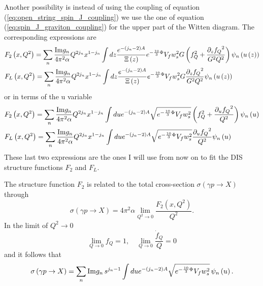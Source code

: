 \documentclass[a4paper,12pt]{article}
\begin{document}
Another possibility is instead of using the coupling of equation (\ref{eq:open_string_spin_J_coupling}) we use the one of equation (\ref{eq:spin_J_graviton_coupling}) for the upper part of the Witten diagram. The corresponding expressions are
\begin{align}
&F_2\left(x, Q^2\right) = \sum_n \frac{{\rm Im} g_n }{4\pi^2 \alpha} Q^{2 j_n} x^{1-j_n} \int dz \frac{e^{-\left(j_n - 2 \right)A }}{\Xi\left(z\right)}e^{-\frac{10}{3} \Phi} V_f w_s^2 G \left(f_Q^2 +\frac{\partial_z{f_Q}^2}{G^2Q^2} \right) \psi_n\left(u\left(z\right)\right)\\
&F_L\left(x, Q^2\right) = \sum_n \frac{{\rm Im} g_n }{4\pi^2 \alpha} Q^{2 j_n} x^{1-j_n} \int dz \frac{e^{-\left(j_n - 2 \right)A }}{\Xi\left(z\right)}e^{-\frac{10}{3} \Phi} V_f w_s^2 G \frac{\partial_z{f_Q}^2}{G^2Q^2} \psi_n\left(u\left(z\right)\right)
\end{align}
or in terms of the u variable
\begin{align}
&F_2\left(x, Q^2\right) = \sum_n \frac{{\rm Im} g_n }{4\pi^2 \alpha} Q^{2 j_n} x^{1-j_n} \int du e^{-\left(j_n - 2 \right)A }\sqrt{e^{-\frac{10}{3} \Phi} V_f w_s^2} \left(f_Q^2 +\frac{\partial_u{f_Q}^2}{Q^2} \right) \psi_n\left(u\right)\\
&F_L\left(x, Q^2\right) = \sum_n \frac{{\rm Im} g_n }{4\pi^2 \alpha} Q^{2 j_n} x^{1-j_n} \int du e^{-\left(j_n - 2 \right)A }\sqrt{e^{-\frac{10}{3} \Phi} V_f w_s^2} \frac{\partial_u{f_Q}^2}{Q^2} \psi_n\left(u\right)
\end{align}
These last two expressions are the ones I will use from now on to fit the DIS structure functions $F_2$ and $F_L$.

The structure function $F_2$ is related to the total cross-section $\sigma\left(\gamma p \rightarrow X\right)$ through
\begin{equation}
\sigma\left(\gamma p \rightarrow X\right) = 4 \pi^2 \alpha \lim_{Q^2 \rightarrow 0} \frac{F_2\left(x, Q^2\right)}{Q^2}.
\end{equation}
In the limit of $Q^2 \rightarrow 0$
\begin{equation}
\lim_{Q\rightarrow 0} f_Q = 1 , \quad \lim_{Q\rightarrow 0} \frac{\dot{f}_Q}{Q} = 0
\end{equation}
and it follows that
\begin{equation}
\sigma\left(\gamma p \rightarrow X\right) = \sum_n {\rm Im} g_n \,  s^{j_n - 1} \int du e^{-\left(j_n - 2 \right)A }\sqrt{e^{-\frac{10}{3} \Phi} V_f w_s^2} \,  \psi_n\left(u\right).
\end{equation}
\end{document}
